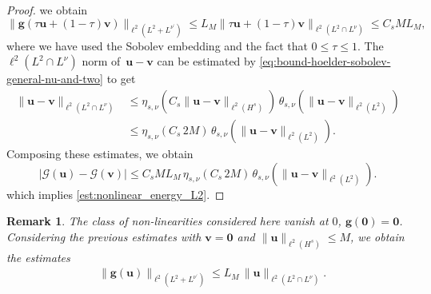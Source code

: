 \documentclass[12pt,a4paper]{amsart}
\newtheorem{remark}[theorem]{Remark}
\numberwithin{equation}{section}
\newcommand{\ulu}{\boldsymbol{u}}
\newcommand{\ulv}{\boldsymbol{v}}
\newcommand{\ulg}{\boldsymbol{g}}
\newcommand{\ulzero}{\boldsymbol{0}}
\newcommand{\twoasts}{{2^*_s}}
\newcommand{\Clip}[1]{L_{#1}}
\newcommand{\thetasnu}{\theta_{s,\nu}}
\begin{document}
\begin{proof}
		we obtain
		\begin{equation*}
			\| \ulg(\tau \ulu + (1-\tau) \ulv ) \|_{ \ell^2(L^2+L^{\nu^\prime})} 
			\leq  \Clip{M}  \| \tau \ulu + (1-\tau) \ulv \|_{\ell^2(L^2\cap L^{\nu})}  
			\leq  C_s M \Clip{M} ,
		\end{equation*}
		where we have used the Sobolev embedding and the fact that $ 0\leq \tau \leq 1$. The $\ell^2(L^2\cap L^{\nu})$ norm of~$\ulu-\ulv$ can be estimated by \eqref{eq:bound-hoelder-sobolev-general-nu-and-two} to get
		\begin{align*}
			\|\ulu-\ulv \|_{\ell^2(L^2\cap L^{\nu})} 
			&\leq   \eta_{s,\nu}(C_{s} \| \ulu - \ulv \|_{\ell^2(H^{s})}) \, \thetasnu ( \| \ulu - \ulv \|_{\ell^2(L^2)}) \\
			&\leq  \eta_{s,\nu}( C_{s} \,2M) \, \thetasnu ( \| \ulu-\ulv \|_{\ell^2(L^2)}) .
		\end{align*}
		Composing these estimates, we obtain
		\begin{equation*}
			\big| \mathscr{G}(\ulu) -\mathscr{G}(\ulv) \big| 
			\leq    C_{s} M \Clip{M}\,\eta_{s,\nu}( C_s\, 2M ) \, \thetasnu ( \| \ulu-\ulv \|_{\ell^2(L^2)}) .\label{estimate_energy_difference}
		\end{equation*}
		which implies \eqref{est:nonlinear_energy_L2}.
	\end{proof}
	
	
	\begin{remark}%
		The class of non-linearities considered here vanish at $0$, $\ulg(\ulzero) = \ulzero $. Considering the previous estimates with $ \ulv = \ulzero $ and $ \|\ulu\|_{\ell^2(H^s)}\leq M $, we obtain the estimates
		\begin{align}
			\label{est:single_nonlinearity_Lp}
			& \| \ulg (\ulu)  \|_{\ell^2(L^2+L^{\nu^\prime})} \leq \Clip{M} \, \| \ulu \|_{\ell^2(L^2\cap L^\nu)}. 
		\end{align}
	\end{remark}
	
\end{document}
